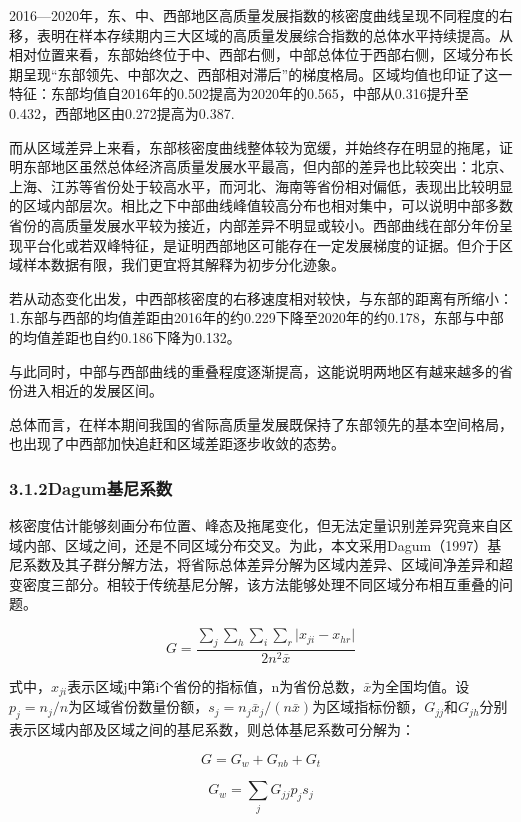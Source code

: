 \documentclass[UTF8,a4paper,12pt,fontset=windows]{ctexart}
\begin{document}
2016---2020年，东、中、西部地区高质量发展指数的核密度曲线呈现不同程度的右移，表明在样本存续期内三大区域的高质量发展综合指数的总体水平持续提高。从相对位置来看，东部始终位于中、西部右侧，中部总体位于西部右侧，区域分布长期呈现``东部领先、中部次之、西部相对滞后''的梯度格局。区域均值也印证了这一特征：东部均值自2016年的0.502提高为2020年的0.565，中部从0.316提升至0.432，西部地区由0.272提高为0.387.

而从区域差异上来看，东部核密度曲线整体较为宽缓，并始终存在明显的拖尾，证明东部地区虽然总体经济高质量发展水平最高，但内部的差异也比较突出：北京、上海、江苏等省份处于较高水平，而河北、海南等省份相对偏低，表现出比较明显的区域内部层次。相比之下中部曲线峰值较高分布也相对集中，可以说明中部多数省份的高质量发展水平较为接近，内部差异不明显或较小。西部曲线在部分年份呈现平台化或若双峰特征，是证明西部地区可能存在一定发展梯度的证据。但介于区域样本数据有限，我们更宜将其解释为初步分化迹象。

若从动态变化出发，中西部核密度的右移速度相对较快，与东部的距离有所缩小：1.东部与西部的均值差距由2016年的约0.229下降至2020年的约0.178，东部与中部的均值差距也自约0.186下降为0.132。

与此同时，中部与西部曲线的重叠程度逐渐提高，这能说明两地区有越来越多的省份进入相近的发展区间。

总体而言，在样本期间我国的省际高质量发展既保持了东部领先的基本空间格局，也出现了中西部加快追赶和区域差距逐步收敛的态势。

\subsubsection{3.1.2Dagum基尼系数}\label{dagumux57faux5c3cux7cfbux6570}

核密度估计能够刻画分布位置、峰态及拖尾变化，但无法定量识别差异究竟来自区域内部、区域之间，还是不同区域分布交叉。为此，本文采用Dagum（1997）基尼系数及其子群分解方法，将省际总体差异分解为区域内差异、区域间净差异和超变密度三部分。相较于传统基尼分解，该方法能够处理不同区域分布相互重叠的问题。

\[G=\frac{\sum_j\sum_h\sum_i\sum_r\lvert x_{ji}-x_{hr}\rvert}{2n^2\bar{x}}\]

式中，\(x_{ji}\)表示区域j中第i个省份的指标值，n为省份总数，\(\bar{x}\)为全国均值。设\(p_j=n_j/n\)为区域省份数量份额，\(s_j=n_j\bar{x}_j/(n\bar{x})\)为区域指标份额，\(G_{jj}\)和\(G_{jh}\)分别表示区域内部及区域之间的基尼系数，则总体基尼系数可分解为：

\[G=G_w+G_{nb}+G_t\]

\[G_w=\sum_j G_{jj}p_js_j\]
\end{document}
